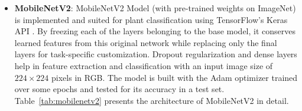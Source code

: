 \documentclass{ijcaArticle}
\begin{document}
\begin{itemize}
\begin{table}[htbp]
\label{tab:model_architecture}
\end{table}

    \item \textbf{MobileNetV2}: MobileNetV2 Model (with pre-trained weights on ImageNet) is implemented and suited for plant classification using TensorFlow's Keras API \cite{p37}. By freezing each of the layers belonging to the base model, it conserves learned features from this original network while replacing only the final layers for task-specific customization. Dropout regularization and dense layers help in feature extraction and classification with an input image size of $224 \times 224$ pixels in RGB. The model is built with the Adam optimizer trained over some epochs and tested for its accuracy in a test set. Table~\ref{tab:mobilenetv2} presents the architecture of MobileNetV2 in detail.


\end{itemize}
\end{document}
